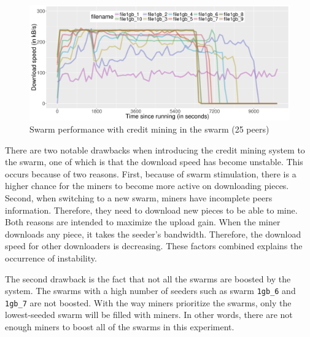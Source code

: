 \begin{figure}[h!]
	\centering
	\includegraphics[width=\textwidth]{pics/results/swperf_sc2_25.png}
	\caption{Swarm performance with credit mining in the swarm (25 peers)}
	\label{fig:swarmcm25perf}
\end{figure}

There are two notable drawbacks when introducing the credit mining system to the swarm, one of which is that the download speed has become unstable. This occurs because of two reasons. First, because of swarm stimulation, there is a higher chance for the miners to become more active on downloading pieces. Second, when switching to a new swarm, miners have incomplete peers information. Therefore, they need to download new pieces to be able to mine. Both reasons are intended to maximize the upload gain. When the miner downloads any piece, it takes the seeder's bandwidth. Therefore, the download speed for other downloaders is decreasing. These factors combined explains the occurrence of instability.

The second drawback is the fact that not all the swarms are boosted by the system. The swarms with a high number of seeders such as swarm \texttt{1gb\_6} and \texttt{1gb\_7} are not boosted. With the way miners prioritize the swarms, only the lowest-seeded swarm will be filled with miners. In other words, there are not enough miners to boost all of the swarms in this experiment.

\vspace{-0.3cm} 
